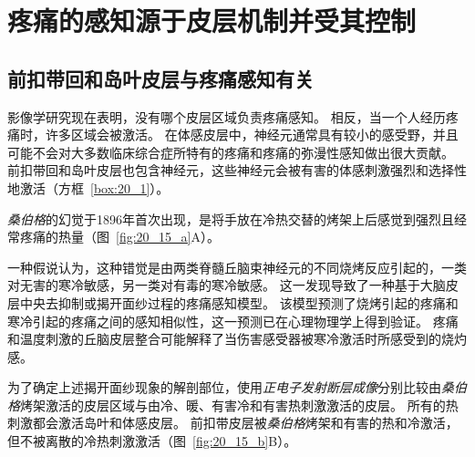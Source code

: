 \section{疼痛的感知源于皮层机制并受其控制}

\subsection{前扣带回和岛叶皮层与疼痛感知有关}

影像学研究现在表明，没有哪个皮层区域负责疼痛感知。 
相反，当一个人经历疼痛时，许多区域会被激活。
在体感皮层中，神经元通常具有较小的感受野，并且可能不会对大多数临床综合症所特有的疼痛和疼痛的弥漫性感知做出很大贡献。
前扣带回和岛叶皮层也包含神经元，这些神经元会被有害的体感刺激强烈和选择性地激活（方框~\ref{box:20_1}）。


\begin{proposition}[大脑皮层幻觉疼痛的定位] \label{box:20_1}
	
	\quad \quad \textit{桑伯格}的幻觉于1896年首次出现，是将手放在冷热交替的烤架上后感觉到强烈且经常疼痛的热量（图~\ref{fig:20_15_a}A）。
	
	\quad \quad 一种假说认为，这种错觉是由两类脊髓丘脑束神经元的不同烧烤反应引起的，一类对无害的寒冷敏感，另一类对有毒的寒冷敏感。
	这一发现导致了一种基于大脑皮层中央去抑制或揭开面纱过程的疼痛感知模型。
	该模型预测了烧烤引起的疼痛和寒冷引起的疼痛之间的感知相似性，这一预测已在心理物理学上得到验证。
	疼痛和温度刺激的丘脑皮层整合可能解释了当伤害感受器被寒冷激活时所感受到的烧灼感。
	
	\quad \quad 为了确定上述揭开面纱现象的解剖部位，使用\textit{正电子发射断层成像}分别比较由\textit{桑伯格}烤架激活的皮层区域与由冷、暖、有害冷和有害热刺激激活的皮层。
	所有的热刺激都会激活岛叶和体感皮层。
	前扣带皮层被\textit{桑伯格}烤架和有害的热和冷激活，但不被离散的冷热刺激激活（图~\ref{fig:20_15_b}B）。
	
\end{proposition}


